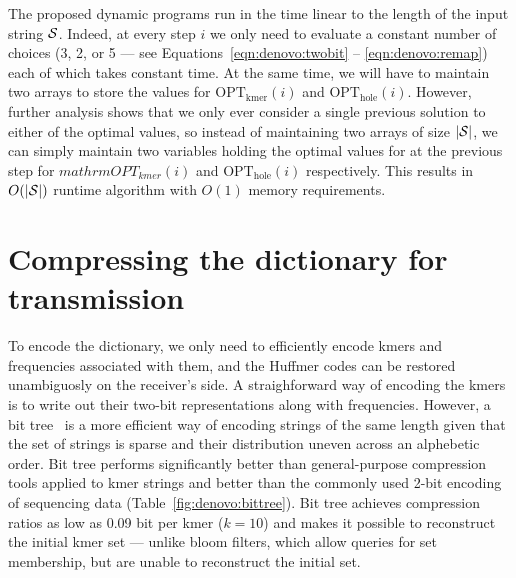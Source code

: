 \documentclass[12pt]{cmuthesis}
\begin{document}
  The proposed dynamic programs run in the time linear to the length of the input string $\mathcal{S}$. Indeed, at every step $i$ we only need to evaluate a constant number of choices (3, 2, or 5 --- see Equations~\ref{eqn:denovo:twobit} -- \ref{eqn:denovo:remap}) each of which takes constant time. At the same time, we will have to maintain two arrays to store the values for $\mathrm{OPT_{kmer}}(i)$ and $\mathrm{OPT_{hole}}(i)$. However, further analysis shows that we only ever consider a single previous solution to either of the optimal values, so instead of maintaining two arrays of size $|\mathcal{S}|$, we can simply maintain two variables holding the optimal values for at the previous step for $mathrm{OPT_{kmer}}(i)$ and $\mathrm{OPT_{hole}}(i)$ respectively. This results in $O(|\mathcal{S}|)$ runtime algorithm with $O(1)$ memory requirements.

\section{Compressing the dictionary for transmission}

To encode the dictionary, we only need to efficiently encode kmers and frequencies associated with them, and the Huffmer codes can be restored unambiguosly on the receiver's side. A straighforward way of encoding the kmers is to write out their two-bit representations along with frequencies. However, a bit tree~\cite{PathEncode} is a more efficient way of encoding strings of the same length given that the set of strings is sparse and their distribution uneven across an alphebetic order. Bit tree performs significantly better than general-purpose compression tools applied to kmer strings and better than the commonly used 2-bit encoding of sequencing data (Table~\ref{fig:denovo:bittree}). Bit tree achieves compression ratios as low as 0.09 bit per kmer ($k=10$) and makes it possible to reconstruct the initial kmer set --- unlike bloom filters, which allow queries for set membership, but are unable to reconstruct the initial set.
\end{document}
